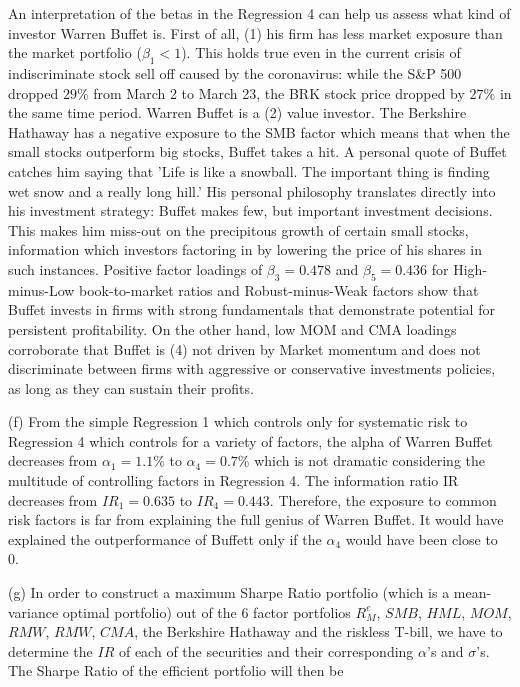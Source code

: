 \documentclass[10pt]{article}
\newenvironment{exercise}[2][Exercise]{\begin{trivlist}
  \item[\hskip \labelsep {\bfseries #1}\hskip \labelsep {\bfseries #2.}]}{\end{trivlist}}
\begin{document}
\begin{exercise}{3}
An interpretation of the betas in the Regression 4 can help us assess what kind
of investor Warren Buffet is. First of all, (1) his firm has less market exposure
than the market portfolio ($\beta_1 < 1$). This holds true even in the current
crisis of indiscriminate stock sell off caused by the coronavirus: while the S\&P 500 dropped $29\%$
from March 2 to March 23, the BRK stock price dropped by $27 \%$ in the same
time period. Warren Buffet
is a (2) value investor. The Berkshire Hathaway has a negative exposure to the
SMB factor which means that when the small stocks outperform big stocks, Buffet
takes a hit. A personal quote of Buffet catches him saying that 'Life is like a
snowball. The important thing is finding wet snow and a really long hill.' His
personal philosophy translates directly into his investment strategy: Buffet
makes few, but important investment decisions. This makes him miss-out on the
precipitous growth of certain small stocks, information which investors factoring in by lowering the price of his
shares in such instances. Positive factor loadings of $\beta_3 = 0.478$ and $\beta_5 = 0.436$ for
High-minus-Low book-to-market ratios and Robust-minus-Weak factors show that
Buffet invests in firms with strong fundamentals that demonstrate potential
for persistent profitability. On the other hand, low MOM and CMA loadings corroborate
that Buffet is (4) not driven by Market momentum and does not discriminate
between firms with aggressive or conservative investments policies, as long as
they can sustain their profits.

(f) From the simple Regression 1 which controls only for systematic risk to
Regression 4 which controls for a variety of factors, the alpha of Warren Buffet
decreases from $\alpha_1 = 1.1\%$ to $\alpha_4 = 0.7 \%$ which is not dramatic
considering the multitude of controlling factors in Regression 4. The
information ratio IR decreases from $IR_1 = 0.635$ to $IR_4 = 0.443$. Therefore, the
exposure to common risk factors is far from explaining the full genius of Warren
Buffet. It would have explained the outperformance of Buffett only if the
$\alpha_4$ would have been close to 0.


(g) In order to construct a maximum Sharpe Ratio portfolio (which is a mean-variance
optimal portfolio) out of the 6 factor portfolios $R^e_M$, $SMB$, $HML$, $MOM$,
$RMW$, $RMW$, $CMA$, the Berkshire Hathaway and the riskless T-bill, we have to
determine the $IR$ of each of the securities and their corresponding $\alpha$'s
and $\sigma$'s. The Sharpe Ratio of the efficient portfolio will then be


\end{exercise}
\end{document}
